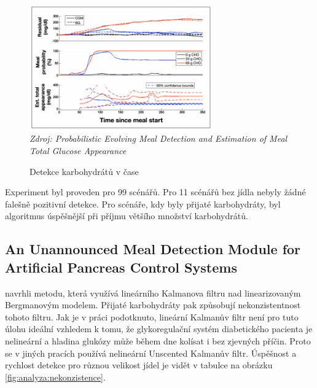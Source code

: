 \begin{figure}[H]
\caption{Detekce karbohydrátů v čase}
\label{fig:analyza:diff1}
\centering
\includegraphics[width=0.7\textwidth]{img/analyzaCHO/diff1.png}\\
\textit{Zdroj: Probabilistic Evolving Meal Detection and Estimation of Meal Total Glucose Appearance \citep{analyzaCHO.Diff}}
\end{figure}

Experiment byl proveden pro 99 scénářů. Pro 11 scénářů bez jídla nebyly žádné falešně pozitivní detekce. Pro scénáře, kdy byly přijaté karbohydráty, byl algoritmus úspěšnější při příjmu většího množství karbohydrátů.


\subsection{An Unannounced Meal Detection Module for Artificial Pancreas Control Systems}
\label{ch:analyzaCHO:nekonzistence}

\citet{analyzaCHO.Nekonzistence} navrhli metodu, která využívá lineárního Kalmanova filtru nad linearizovaným Bergmanovým modelem. Přijaté karbohydráty pak způsobují nekonzistentnost tohoto filtru. Jak je v práci podotknuto, lineární Kalmanův filtr není pro tuto úlohu ideální vzhledem k tomu, že glykoregulační systém diabetického pacienta je nelineární a hladina glukózy může během dne kolísat i bez zjevných příčin. Proto se v jiných pracích používá nelineární Unscented Kalmanův filtr. Úspěšnost a rychlost detekce pro různou velikost jídel je vidět v tabulce na obrázku \ref{fig:analyza:nekonzistence}.

